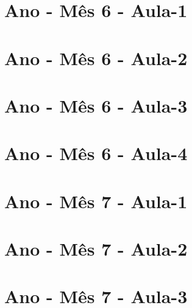 \begin{multicols}{2}
\section[\sffamily 4\textordmasculine\space Ano - M\^{e}s 6 - Aula-1]{\textordmasculine\space Ano - M\^{e}s 6 - Aula-1}


\section[\sffamily 4\textordmasculine\space Ano - M\^{e}s 6 - Aula-2]{\textordmasculine\space Ano - M\^{e}s 6 - Aula-2}


\section[\sffamily 4\textordmasculine\space Ano - M\^{e}s 6 - Aula-3]{\textordmasculine\space Ano - M\^{e}s 6 - Aula-3}


\section[\sffamily 4\textordmasculine\space Ano - M\^{e}s 6 - Aula-4]{\textordmasculine\space Ano - M\^{e}s 6 - Aula-4}


\section[\sffamily 4\textordmasculine\space Ano - M\^{e}s 7 - Aula-1]{\textordmasculine\space Ano - M\^{e}s 7 - Aula-1}


\section[\sffamily 4\textordmasculine\space Ano - M\^{e}s 7 - Aula-2]{\textordmasculine\space Ano - M\^{e}s 7 - Aula-2}


\section[\sffamily 4\textordmasculine\space Ano - M\^{e}s 7 - Aula-3]{\textordmasculine\space Ano - M\^{e}s 7 - Aula-3}



\end{multicols}
